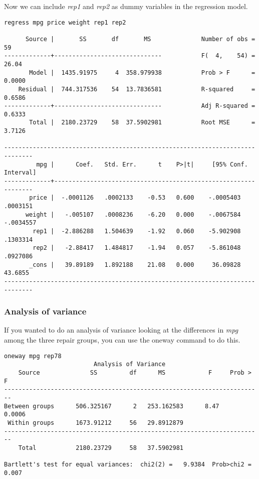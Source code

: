Now we can include \textit{rep1} and \textit{rep2} as dummy variables in the regression model.

\begin{lstlisting}
regress mpg price weight rep1 rep2

      Source |       SS       df       MS              Number of obs =      59
-------------+------------------------------           F(  4,    54) =   26.04
       Model |  1435.91975     4  358.979938           Prob > F      =  0.0000
    Residual |  744.317536    54  13.7836581           R-squared     =  0.6586
-------------+------------------------------           Adj R-squared =  0.6333
       Total |  2180.23729    58  37.5902981           Root MSE      =  3.7126

------------------------------------------------------------------------------
         mpg |      Coef.   Std. Err.      t    P>|t|     [95% Conf. Interval]
-------------+----------------------------------------------------------------
       price |  -.0001126   .0002133    -0.53   0.600    -.0005403    .0003151
      weight |   -.005107   .0008236    -6.20   0.000    -.0067584   -.0034557
        rep1 |  -2.886288   1.504639    -1.92   0.060    -5.902908    .1303314
        rep2 |   -2.88417   1.484817    -1.94   0.057    -5.861048    .0927086
       _cons |   39.89189   1.892188    21.08   0.000     36.09828     43.6855
------------------------------------------------------------------------------
\end{lstlisting}

\subsubsection{Analysis of variance}

If you wanted to do an analysis of variance looking at the differences in \textit{mpg} among the three repair groups, you can use the oneway command to do this.

\begin{lstlisting}
oneway mpg rep78
                         Analysis of Variance
    Source              SS         df      MS            F     Prob > F
------------------------------------------------------------------------
Between groups      506.325167      2   253.162583      8.47     0.0006
 Within groups      1673.91212     56   29.8912879
------------------------------------------------------------------------
    Total           2180.23729     58   37.5902981

Bartlett's test for equal variances:  chi2(2) =   9.9384  Prob>chi2 = 0.007
\end{lstlisting}

